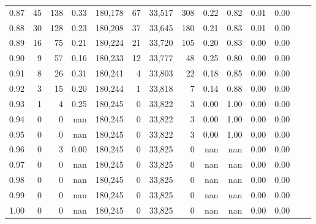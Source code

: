 \begin{tabular}{rrrrrrrrrrrrrr}
0.87 &     45 &  138 &    0.33 &  180,178 &       67 &  33,517 &     308 &  0.22 &  0.82 &  0.01 &      0.00 \\
0.88 &     30 &  128 &    0.23 &  180,208 &       37 &  33,645 &     180 &  0.21 &  0.83 &  0.01 &      0.00 \\
0.89 &     16 &   75 &    0.21 &  180,224 &       21 &  33,720 &     105 &  0.20 &  0.83 &  0.00 &      0.00 \\
0.90 &      9 &   57 &    0.16 &  180,233 &       12 &  33,777 &      48 &  0.25 &  0.80 &  0.00 &      0.00 \\
0.91 &      8 &   26 &    0.31 &  180,241 &        4 &  33,803 &      22 &  0.18 &  0.85 &  0.00 &      0.00 \\
0.92 &      3 &   15 &    0.20 &  180,244 &        1 &  33,818 &       7 &  0.14 &  0.88 &  0.00 &      0.00 \\
0.93 &      1 &    4 &    0.25 &  180,245 &        0 &  33,822 &       3 &  0.00 &  1.00 &  0.00 &      0.00 \\
0.94 &      0 &    0 &     nan &  180,245 &        0 &  33,822 &       3 &  0.00 &  1.00 &  0.00 &      0.00 \\
0.95 &      0 &    0 &     nan &  180,245 &        0 &  33,822 &       3 &  0.00 &  1.00 &  0.00 &      0.00 \\
0.96 &      0 &    3 &    0.00 &  180,245 &        0 &  33,825 &       0 &   nan &   nan &  0.00 &      0.00 \\
0.97 &      0 &    0 &     nan &  180,245 &        0 &  33,825 &       0 &   nan &   nan &  0.00 &      0.00 \\
0.98 &      0 &    0 &     nan &  180,245 &        0 &  33,825 &       0 &   nan &   nan &  0.00 &      0.00 \\
0.99 &      0 &    0 &     nan &  180,245 &        0 &  33,825 &       0 &   nan &   nan &  0.00 &      0.00 \\
1.00 &      0 &    0 &     nan &  180,245 &        0 &  33,825 &       0 &   nan &   nan &  0.00 &      0.00 \\
\bottomrule
\end{tabular}
